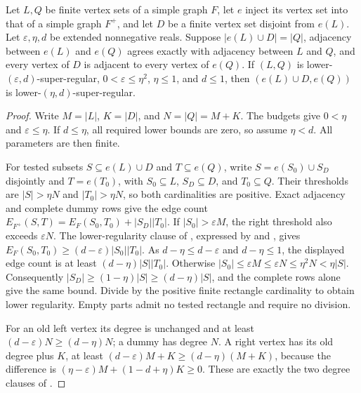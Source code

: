 \begin{lemma}
Let $L,Q$ be finite vertex sets of a simple graph $F$, let $e$ inject its vertex set into that of a simple graph $F^+$, and let $D$ be a finite vertex set disjoint from $e(L)$. Let $\varepsilon,\eta,d$ be extended nonnegative reals. Suppose $|e(L)\cup D|=|Q|$, adjacency between $e(L)$ and $e(Q)$ agrees exactly with adjacency between $L$ and $Q$, and every vertex of $D$ is adjacent to every vertex of $e(Q)$. If $(L,Q)$ is lower-$(\varepsilon,d)$-super-regular, $0<\varepsilon\leq\eta^2$, $\eta\leq1$, and $d\leq1$, then $(e(L)\cup D,e(Q))$ is lower-$(\eta,d)$-super-regular.
\end{lemma}
\begin{proof}
Write $M=|L|$, $K=|D|$, and $N=|Q|=M+K$. The budgets give $0<\eta$ and $\varepsilon\leq\eta$. If $d\leq\eta$, all required lower bounds are zero, so assume $\eta<d$. All parameters are then finite.

For tested subsets $S\subseteq e(L)\cup D$ and $T\subseteq e(Q)$, write $S=e(S_0)\cup S_D$ disjointly and $T=e(T_0)$, with $S_0\subseteq L$, $S_D\subseteq D$, and $T_0\subseteq Q$. Their thresholds are $|S|>\eta N$ and $|T_0|>\eta N$, so both cardinalities are positive. Exact adjacency and complete dummy rows give the edge count
$E_{F^+}(S,T)=E_F(S_0,T_0)+|S_D||T_0|$.
If $|S_0|>\varepsilon M$, the right threshold also exceeds $\varepsilon N$. The lower-regularity clause of , expressed by  and , gives $E_F(S_0,T_0)\geq(d-\varepsilon)|S_0||T_0|$. As $d-\eta\leq d-\varepsilon$ and $d-\eta\leq1$, the displayed edge count is at least $(d-\eta)|S||T_0|$.
Otherwise $|S_0|\leq\varepsilon M\leq\varepsilon N\leq\eta^2N<\eta|S|$. Consequently $|S_D|\geq(1-\eta)|S|\geq(d-\eta)|S|$, and the complete rows alone give the same bound. Divide by the positive finite rectangle cardinality to obtain lower regularity. Empty parts admit no tested rectangle and require no division.

For an old left vertex its degree is unchanged and at least $(d-\varepsilon)N\geq(d-\eta)N$; a dummy has degree $N$. A right vertex has its old degree plus $K$, at least $(d-\varepsilon)M+K\geq(d-\eta)(M+K)$, because the difference is $(\eta-\varepsilon)M+(1-d+\eta)K\geq0$. These are exactly the two degree clauses of .
\end{proof}
